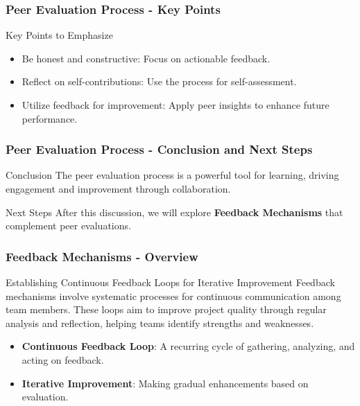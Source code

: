 \documentclass[aspectratio=169]{beamer}
\begin{document}
\begin{frame}[fragile]
    \frametitle{Peer Evaluation Process - Key Points}
    \begin{block}{Key Points to Emphasize}
        \begin{itemize}
            \item Be honest and constructive: Focus on actionable feedback.
            \item Reflect on self-contributions: Use the process for self-assessment.
            \item Utilize feedback for improvement: Apply peer insights to enhance future performance.
        \end{itemize}
    \end{block}
\end{frame}

\begin{frame}[fragile]
    \frametitle{Peer Evaluation Process - Conclusion and Next Steps}
    \begin{block}{Conclusion}
        The peer evaluation process is a powerful tool for learning, driving engagement and improvement through collaboration.
    \end{block}
    
    \begin{block}{Next Steps}
        After this discussion, we will explore \textbf{Feedback Mechanisms} that complement peer evaluations.
    \end{block}
\end{frame}

\begin{frame}[fragile]
    \frametitle{Feedback Mechanisms - Overview}
    \begin{block}{Establishing Continuous Feedback Loops for Iterative Improvement}
        Feedback mechanisms involve systematic processes for continuous communication among team members. These loops aim to improve project quality through regular analysis and reflection, helping teams identify strengths and weaknesses.
    \end{block}
    
    \begin{itemize}
        \item \textbf{Continuous Feedback Loop}: A recurring cycle of gathering, analyzing, and acting on feedback.
        \item \textbf{Iterative Improvement}: Making gradual enhancements based on evaluation.
    \end{itemize}
\end{frame}
\end{document}
